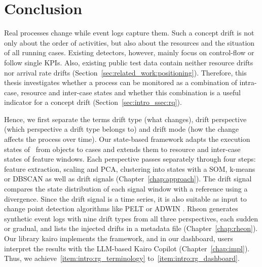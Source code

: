 \chapter{Conclusion}
\label{chap:conclusion}
Real processes change while event logs capture them. Such a concept drift is not only about the order of activities, but also about the resources and the situation of all running cases. Existing detectors, however, mainly focus on control-flow or follow single KPIs. Also, existing public test data contain neither resource drifts nor arrival rate drifts (Section~\ref{sec:related_work:positioning}). Therefore, this thesis investigates whether a process can be monitored as a combination of intra-case, resource and inter-case states and whether this combination is a useful indicator for a concept drift (Section~\ref{sec:intro_ssec:rq}).

Hence, we first separate the terms drift type (what changes), drift perspective (which perspective a drift type belongs to) and drift mode (how the change affects the process over time). Our state-based framework adapts the execution states of~\textcite{berti2025ocel} from objects to cases and extends them to resource and inter-case states of feature windows. Each perspective passes separately through four steps: feature extraction, scaling and PCA, clustering into states with a SOM, k-means or DBSCAN as well as drift signals (Chapter~\ref{chap:approach}). The drift signal compares the state distribution of each signal window with a reference using a divergence. Since the drift signal is a time series, it is also suitable as input to change point detection algorithms like PELT \autocite{adams2023explainable} or ADWIN \autocite{baier2020handling}. Rheon generates synthetic event logs with nine drift types from all three perspectives, each sudden or gradual, and lists the injected drifts in a metadata file (Chapter~\ref{chap:rheon}). Our library kairo implements the framework, and in our dashboard, users interpret the results with the LLM-based Kairo Copilot (Chapter~\ref{chap:impl}). Thus, we achieve~\ref{item:intro:rg_terminology} to~\ref{item:intro:rg_dashboard}.

